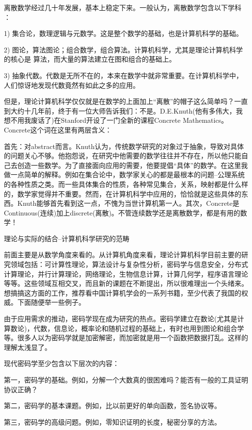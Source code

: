 离散数学经过几十年发展，基本上稳定下来。一般认为，离散数学包含以下学科 ：

1) 集合论，数理逻辑与元数学。这是整个数学的基础，也是计算机科学的基础。

2) 图论，算法图论；组合数学，组合算法。计算机科学，尤其是理论计算机科学的核心是 
算法，而大量的算法建立在图和组合的基础上。

3) 抽象代数。代数是无所不在的，本来在数学中就非常重要。在计算机科学中，人们惊讶地发现代数竟然有如此之多的应用。


但是，理论计算机科学仅仅就是在数学的上面加上“离散”的帽子这么简单吗？一直到大约十几年前，终于有一位大师告诉我们：不是。D.E.Knuth(他有多伟大，我想不用我废话了)在Stanford开设了一门全新的课程Concrete Mathematics。 Concrete这个词在这里有两层含义：


首先：对abstract而言。Knuth认为，传统数学研究的对象过于抽象，导致对具体的问题关心不够。他抱怨说，在研究中他需要的数学往往并不存在，所以他只能自己去创造一些数学。为了直接面向应用的需要，他要提倡“具体”的数学。在这里我做一点简单的解释。例如在集合论中，数学家关心的都是最根本的问题--公理系统的各种性质之类。而一些具体集合的性质，各种常见集合，关系，映射都是什么样的，数学家觉得并不重要。然而，在计算机科学中应用的，恰恰就是这些具体的东西。Knuth能够首先看到这一点，不愧为当世计算机第一人。其次，Concrete是Continuous(连续)加上discrete(离散)。不管连续数学还是离散数学，都是有用的数学！


理论与实际的结合--计算机科学研究的范畴


前面主要是从数学角度来看的。从计算机角度来看，理论计算机科学目前主要的研究领域包括：可计算性理论，算法设计与复杂性分析，密码学与信息安全，分布式计算理论，并行计算理论，网络理论，生物信息计算，计算几何学，程序语言理论等等。这些领域互相交叉，而且新的课题在不断提出，所以很难理出一个头绪来。想搞搞这方面的工作，推荐看中国计算机学会的一系列书籍，至少代表了我国的权威。下面随便举一些例子。


由于应用需求的推动，密码学现在成为研究的热点。密码学建立在数论(尤其是计算数论)，代数，信息论，概率论和随机过程的基础上，有时也用到图论和组合学等。很多人以为密码学就是加密解密，而加密就是用一个函数把数据打乱。这样的理解太浅显了。


现代密码学至少包含以下层次的内容：

第一，密码学的基础。例如，分解一个大数真的很困难吗？能否有一般的工具证明协议正确？

第二，密码学的基本课题。例如，比以前更好的单向函数，签名协议等。

第三，密码学的高级问题。例如，零知识证明的长度，秘密分享的方法。

